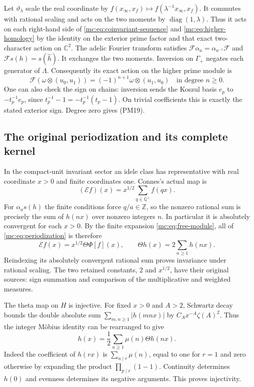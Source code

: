 \documentclass[11pt,a4paper]{article}
\theoremstyle{definition}\newtheorem{definition}[theorem]{Definition}
\newcommand{\Z}{\mathbb Z}\newcommand{\Q}{\mathbb Q}
\newcommand{\C}{\mathbb C}\newcommand{\R}{\mathbb R}
\begin{document}
Let $\vartheta_\lambda$ scale the real coordinate by
$f(x_\infty,x_f)\mapsto f(\lambda^{-1}x_\infty,x_f)$.
It commutes with rational scaling and acts on the two moments by
$\operatorname{diag}(1,\lambda)$. Thus it acts on each right-hand
side of \eqref{mc:eq:coinvariant-sequence} and
\eqref{mc:eq:higher-homology} by the identity on the exterior prime
factor and that exact two-character action on $\C^2$.
The adelic Fourier transform satisfies
$\mathcal F\alpha_a=\alpha_{a^{-1}}\mathcal F$ and
$\mathcal Fs(h)=s(\widehat h)$. It exchanges the two moments.
Inversion on $\Gamma_+$ negates each generator of $\Lambda$.
Consequently its exact action on the higher prime module is
\[
 \mathcal F(\omega\otimes(u_0,u_1))
       =(-1)^{n+1}\omega\otimes(u_1,u_0)
 \quad\text{in degree }n\ge0.
 \tag{MC13}\label{mc:eq:higher-fourier}
\]
One can also check the sign on chains: inversion sends the Koszul
basis $e_p$ to $-t_p^{-1}e_p$, since
$t_p^{-1}-1=-t_p^{-1}(t_p-1)$. On trivial coefficients this is
exactly the stated exterior sign. Degree zero gives (PM19).

\subsection{The original periodization and its complete kernel}

In the compact-unit invariant sector an idele class has representative
with real coordinate $x>0$ and finite coordinates one. Connes's
actual map is
\[
 (\mathcal Ef)(x)=x^{1/2}\sum_{q\in\Q^\times}f(qx).
 \tag{MC14}\label{mc:eq:periodization}
\]
For $\alpha_as(h)$ the finite conditions force $q/a\in\Z$, so
the nonzero rational sum is precisely the sum of $h(nx)$ over
nonzero integers $n$. In particular it is absolutely convergent
for each $x>0$. By the finite expansion \eqref{mc:eq:free-module},
all of \eqref{mc:eq:periodization} is therefore
\[
 \mathcal Ef(x)=x^{1/2}\Theta\Phi[f](x),\qquad
 \Theta h(x)=2\sum_{n\ge1}h(nx).
 \tag{MC15}\label{mc:eq:theta}
\]
Reindexing its absolutely convergent rational sum proves invariance
under rational scaling. The two retained constants, $2$ and
$x^{1/2}$, have their original sources: sign summation and comparison
of the multiplicative and weighted measures.

The theta map on $H$ is injective. For fixed $x>0$ and $A>2$,
Schwartz decay bounds the double absolute sum
$\sum_{m,n\ge1}|h(mnx)|$ by $C_Ax^{-A}\zeta(A)^2$. Thus the
integer M\"obius identity can be rearranged to give
\[
 h(x)=\frac12\sum_{n\ge1}\mu(n)\Theta h(nx).
 \tag{MC16}\label{mc:eq:mobius}
\]
Indeed the coefficient of $h(rx)$ is $\sum_{n\mid r}\mu(n)$,
equal to one for $r=1$ and zero otherwise by expanding the product
$\prod_{p\mid r}(1-1)$. Continuity determines $h(0)$ and evenness
determines its negative arguments. This proves injectivity.
\end{document}
